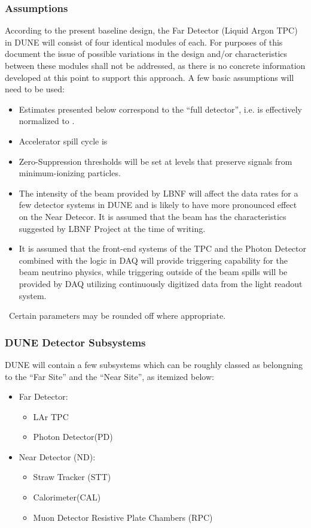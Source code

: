\subsubsection{Assumptions}
\label{sec:detectors-sc-infrastructure-assumptions}
According to the present baseline design, the Far Detector (Liquid Argon TPC) in DUNE will consist
of four identical modules of \tpcdetectormass each.
For purposes of this document the issue of possible variations in the design and/or characteristics
between these modules shall not be addressed, as there is no concrete information developed at
this point to support this approach. A few basic assumptions will need to be used:
\begin{itemize}
\item Estimates presented below correspond to the ``full detector'', i.e. is effectively
normalized to \dunedetectormass.
\item Accelerator spill cycle is \beamspillcycle
\item Zero-Suppression thresholds will be set at levels that preserve signals from minimum-ionizing particles.
\item The intensity of the beam provided by LBNF will affect the data rates for a few detector
systems in DUNE and is likely to have more pronounced effect on the Near Detecor.
It is assumed that the beam has the characteristics suggested by LBNF Project at the time of writing.
\item It is assumed that the front-end systems of the TPC and the Photon Detector combined
with the logic in DAQ will provide triggering capability for the beam neutrino physics, while
triggering outside of the beam spills will be provided by DAQ utilizing continuously digitized
data from the light readout system.
\end{itemize}
\
Certain parameters may be rounded off where appropriate.

\subsubsection{DUNE Detector Subsystems}
DUNE will contain a few subsystems which can be roughly classed as belongning to the ``Far Site'' and the ``Near Site'', as
itemized below:
\begin{itemize}
\item Far Detector:
\begin{itemize}
\item LAr TPC
\item Photon Detector(PD)
\end{itemize}
\item Near Detector (ND):
\begin{itemize}
\item  Straw Tracker (STT)
\item Calorimeter(CAL)
\item Muon Detector Resistive Plate Chambers (RPC)
\end{itemize}
\end{itemize}

